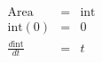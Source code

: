 \documentclass{article}
\begin{document}
\begin{eqnarray*}
\mathrm{Area}&=&\mathrm{int}\\
\mathrm{int}(0)&=&0\\
\frac{ d \mathrm{int}}{dt} &=& t \\
\end{eqnarray*}
\end{document}
